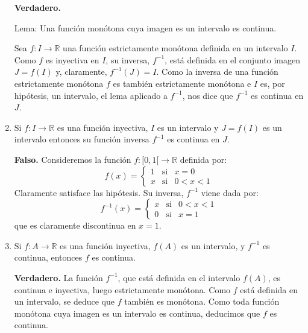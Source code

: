 \documentclass[10pt,a4paper]{article}
\begin{document}
\begin{enumerate}
		\textbf{Verdadero. }
		
		Lema: Una función monótona cuya imagen es un intervalo es continua.
		
		Sea $f: I \rightarrow \mathbb{R}$ una función estrictamente monótona definida en un intervalo $I$. Como $f$ es inyectiva en $I$, su inversa, $f^{-1}$, está definida en el conjunto imagen $J = f(I)$ y, claramente, $f^{-1}(J) = I$. Como la inversa de una función estrictamente monótona $f$ es también estrictamente monótona e $I$ es, por hipótesis, un intervalo, el lema aplicado a $f^{-1}$, nos dice que $f^{-1}$ es continua en $J$. \newline
		
		\item Si $f: I \rightarrow \mathbb{R}$ es una función inyectiva, $I$ es un intervalo y $J = f(I)$ es un intervalo entonces su función inversa $f^{-1}$ es continua en $J$.
		
		\textbf{Falso. }Consideremos la función $f : [0, 1[ \rightarrow \mathbb{R}$ definida por:
		\begin{equation*}
			f(x)= \left\{ \begin{array}{lcc}
				1 &   \text{si}  & x = 0 \\
				x &  \text{si} & 0 < x < 1
			\end{array}
			\right.
		\end{equation*}
		Claramente satisface las hipótesis. Su inversa, $f^{-1}$ viene dada por:
		\begin{equation*}
			f^{-1}(x)= \left\{ \begin{array}{lcc}
				x &   \text{si}  & 0 < x < 1 \\
				0 &  \text{si} & x = 1
			\end{array}
			\right.
		\end{equation*}
		que es claramente discontinua en $x = 1$. \newline
		
		\item Si $f : A \rightarrow \mathbb{R}$ es una función inyectiva, $f(A)$ es un intervalo, y $f^{-1}$ es continua, entonces $f$ es continua.
		
		\textbf{Verdadero. }La función $f^{-1}$, que está definida en el intervalo $f(A)$, es continua e inyectiva, luego estrictamente monótona. Como $f$ está definida en un intervalo, se deduce que $f$ también es monótona. Como toda función monótona cuya imagen es un intervalo es continua, deducimos que $f$ es continua. \newline
		

\end{enumerate}
\end{document}

